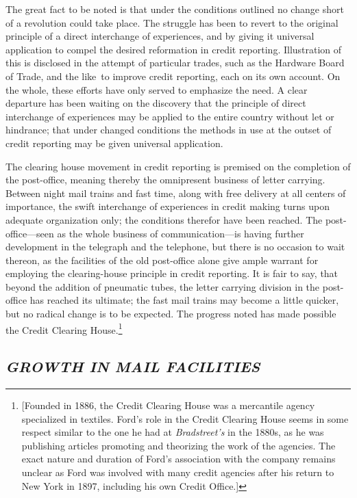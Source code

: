 \documentclass[twoside,symmetric,nobib,justified]{tufte-book}
\begin{document}
The great fact to be noted is that under the conditions outlined no
change short of a revolution could take place. The struggle has been to
revert to the original principle of a direct interchange of experiences,
and by giving it universal application to compel the desired reformation
in credit reporting. Illustration of this is disclosed in the attempt of
particular trades, such as the Hardware Board of Trade, and the like~to
improve credit reporting, each on its own account. On the whole, these
efforts have only served to emphasize the need. A clear departure has
been waiting on the discovery that the principle of direct interchange
of experiences may be applied to the entire country without let or
hindrance; that under changed conditions the methods in use at the
outset of credit reporting may be given universal application.~

The clearing house movement in credit reporting is premised on the
completion of the post-office, meaning thereby the omnipresent business
of letter carrying. Between night mail trains and fast time, along with
free delivery at all centers of importance, the swift interchange of
experiences in credit making turns upon adequate organization only; the
conditions therefor have been reached. The post-office---seen as the
whole business of communication---is having further development in the
telegraph and the telephone, but there is no occasion to wait thereon,
as the facilities of the old post-office alone give ample warrant for
employing the clearing-house principle in credit reporting. It is fair
to say, that beyond the addition of pneumatic tubes, the letter carrying
division in the post-office has reached its ultimate; the fast mail
trains may become a little quicker, but no radical change is to be
expected. The progress noted has made possible the Credit Clearing
House.\footnote{{[}Founded in 1886, the Credit Clearing House was a
  mercantile agency specialized in textiles. Ford's role in the Credit
  Clearing House seems in some respect similar to the one he had at
  \emph{Bradstreet's} in the 1880s, as he was publishing articles
  promoting and theorizing the work of the agencies. The exact nature
  and duration of Ford's association with the company remains unclear as
  Ford was involved with many credit agencies after his return to New
  York in 1897, including his own Credit Office.{]}}

\hypertarget{growth-in-mail-facilities}{%
\subsection{\texorpdfstring{\emph{GROWTH IN MAIL
FACILITIES}}{GROWTH IN MAIL FACILITIES}}\label{growth-in-mail-facilities}}
\end{document}
